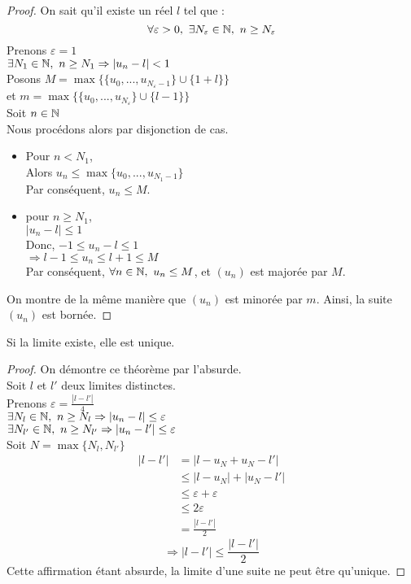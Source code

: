 \documentclass[../main.tex]{subfile}
\begin{document}
\begin{proof}
	On sait qu'il existe un réel $l$ tel que :
	$$\forall \varepsilon > 0, \ \exists N_{\varepsilon} \in \NN, \ n \geq N_{\varepsilon}$$
	Prenons $\varepsilon = 1$\\
	$\exists N_1 \in \mathbb{N} , \ n \geq N_1 \Rightarrow |u_n -l| < 1$\\
	Posons $M = \max \{\{u_0, ..., u_{N_{\varepsilon}-1}\} \cup \{1+l\}\}$\\
	et $m = \max \{\{u_0, ..., u_{N_{\varepsilon}}\} \cup \{l-1\}\}$\\
	Soit $n \in \mathbb{N}$\\
	Nous procédons alors par disjonction de cas.
	\begin{itemize}
		\item Pour $n < N_1$, \\
		Alors $u_n \leq \max\{u_0, ..., u_{N_1 -1}\}$\\
		Par conséquent, $u_n \leq M$.

		\item pour $n \geq N_1$, \\
		$|u_n -l| \leq 1$\\
		Donc, $-1 \leq u_n -l \leq 1$\\
		$\Rightarrow l-1 \leq u_n \leq l +1 \leq M$\\
		Par conséquent, $\forall n \in \mathbb{N}, \ u_n \leq M$, et $(u_n)$ est majorée par $M$.\\
	\end{itemize}
	On montre de la même manière que $(u_n)$ est minorée par $m$.
	Ainsi, la suite $(u_n)$ est bornée.
\end{proof}

\begin{theo}
	Si la limite existe, elle est unique.
\end{theo}

\begin{proof}
	On démontre ce théorème par l'absurde.\\
	Soit $l$ et $l'$ deux limites distinctes.\\
	Prenons $\varepsilon = \frac{|l-l'|}{4}$\\
	$\exists N_l \in \mathbb{N}, \ n \geq N_l \Rightarrow |u_n-l| \leq \varepsilon$\\
	$\exists N_{l'} \in \mathbb{N}, \ n \geq N_{l'} \Rightarrow |u_n-l'| \leq \varepsilon$\\
	Soit $N = \max\{N_l, N_{l'}\}$\\
	\begin{align}
		|l-l'| &= |l- u_N + u_N -l'|\\
		&\leq |l -u_N| + |u_N -l'|\\
		&\leq \varepsilon + \varepsilon\\
		&\leq 2 \varepsilon\\
		&= \frac{|l-l'|}{2}
	\end{align}
	$$\Rightarrow |l-l'| \leq \frac{|l-l'|}{2}$$
	Cette affirmation étant absurde, la limite d'une suite ne peut être qu'unique.
\end{proof}
\end{document}
